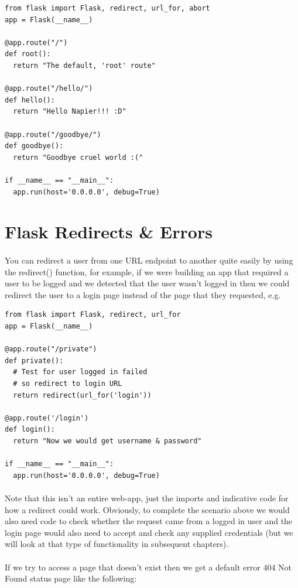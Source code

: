 \documentclass[12pt, a4paper, twoside]{book}
\begin{document}
\begin{lstlisting}
from flask import Flask, redirect, url_for, abort
app = Flask(__name__)

@app.route("/")
def root():
  return "The default, 'root' route"

@app.route("/hello/")
def hello():
  return "Hello Napier!!! :D"

@app.route("/goodbye/")
def goodbye():
  return "Goodbye cruel world :("

if __name__ == "__main__":
  app.run(host='0.0.0.0', debug=True)
\end{lstlisting}

\section{Flask Redirects \& Errors}
\label{errors}
\paragraph{} You can redirect a user from one URL endpoint to another quite easily by using the redirect() function, for example, if we were building an app that required a user to be logged and we detected that the user wasn't logged in then we could redirect the user to a login page instead of the page that they requested, e.g.

\begin{lstlisting}
from flask import Flask, redirect, url_for
app = Flask(__name__)

@app.route("/private")
def private():
  # Test for user logged in failed
  # so redirect to login URL
  return redirect(url_for('login'))

@app.route('/login')
def login():
  return "Now we would get username & password"

if __name__ == "__main__":
  app.run(host='0.0.0.0', debug=True)
\end{lstlisting}
\paragraph{} Note that this isn't an entire web-app, just the imports and indicative code for how a redirect could work. Obviously, to complete the scenario above we would also need code to check whether the request came from a logged in user and the login page would also need to accept and check any supplied credentials (but we will look at that type of functionality in subsequent chapters). 

\paragraph{} If we try to access a page that doesn't exist then we get a default error 404 Not Found status page like the following:
\end{document}
